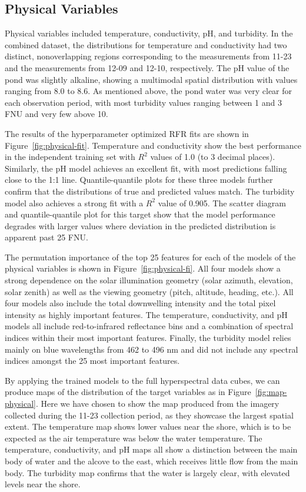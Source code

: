 \documentclass[remotesensing,article,submit,pdftex,moreauthors]{Definitions/mdpi}
\begin{document}
\subsection{Physical Variables}

Physical variables included temperature, conductivity, pH, and turbidity. In the combined dataset, the distributions for temperature and conductivity had two distinct, nonoverlapping regions corresponding to the measurements from 11-23 and the measurements from 12-09 and 12-10, respectively. The pH value of the pond was slightly alkaline, showing a multimodal spatial distribution with values ranging from 8.0 to 8.6. As mentioned above, the pond water was very clear for each observation period, with most turbidity values ranging between 1 and 3 FNU and very few above 10.

The results of the hyperparameter optimized RFR fits are shown in Figure~\ref{fig:physical-fit}. Temperature and conductivity show the best performance in the independent training set with $R^2$ values of 1.0 (to 3 decimal places). Similarly, the pH model achieves an excellent fit, with most predictions falling close to the 1:1 line. Quantile-quantile plots for these three models further confirm that the distributions of true and predicted values match. The turbidity model also achieves a strong fit with a $R^2$ value of 0.905. The scatter diagram and quantile-quantile plot for this target show that the model performance degrades with larger values where deviation in the predicted distribution is apparent past 25 FNU.

The permutation importance of the top 25 features for each of the models of the physical variables is shown in Figure~\ref{fig:physical-fi}. All four models show a strong dependence on the solar illumination geometry (solar azimuth, elevation, solar zenith) as well as the viewing geometry (pitch, altitude, heading, etc.). All four models also include the total downwelling intensity and the total pixel intensity as highly important features. The temperature, conductivity, and pH models all include red-to-infrared reflectance bins and a combination of spectral indices within their most important features. Finally, the turbidity model relies mainly on blue wavelengths from 462 to 496 nm and did not include any spectral indices amongst the 25 most important features.

By applying the trained models to the full hyperspectral data cubes, we can produce maps of the distribution of the target variables as in Figure~\ref{fig:map-physical}. Here we have chosen to show the map produced from the imagery collected during the 11-23 collection period, as they showcase the largest spatial extent. The temperature map shows lower values near the shore, which is to be expected as the air temperature was below the water temperature. The temperature, conductivity, and pH maps all show a distinction between the main body of water and the alcove to the east, which receives little flow from the main body. The turbidity map confirms that the water is largely clear, with elevated levels near the shore.
\end{document}
